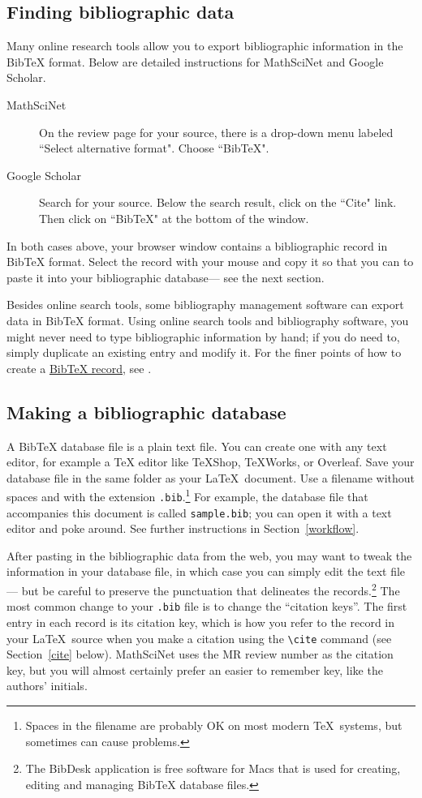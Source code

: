\documentclass[11pt]{amsart}
\theoremstyle{definition}                  %
\theoremstyle{remark}                       %
\numberwithin{equation}{section}
\begin{document}
\subsection{Finding bibliographic data}

Many online research tools allow you to export bibliographic information in the BibTeX format. Below are detailed instructions for MathSciNet and Google Scholar.

\begin{description}
\item[MathSciNet]
On the review page for your source, there is a drop-down menu labeled ``Select alternative format". Choose ``BibTeX". 
\item[Google Scholar]
Search for your source. Below the search result, click on the ``Cite" link. Then click on ``BibTeX" at the bottom of the window. 
\end{description}
In both cases above, your browser window contains a bibliographic record in BibTeX format. Select the record with your mouse and copy it so that you can to paste it into your bibliographic database--- see the next section.

Besides online search tools, some bibliography management software  can export data in BibTeX format. Using  online search tools and bibliography software, you might never need to type bibliographic information by hand;  if you do need to, simply duplicate an existing entry and modify it. For the finer points of how to create a \href{https://en.wikibooks.org/wiki/LaTeX/Bibliography_Management}{BibTeX record}, see \cite[\S 5.3.3.1--5]{wikibook}.

\subsection{Making a bibliographic database}
A BibTeX database file is a plain text file. You can create one with any text editor, for example a TeX editor like TeXShop, TeXWorks, or Overleaf.
Save your database file in the same folder as your \LaTeX\ document. Use a filename without spaces and with the extension \texttt{.bib}.\footnote{Spaces in the filename are probably OK on most modern \TeX\ systems, but sometimes can cause  problems.} For example, the database file that accompanies this document is called \texttt{sample.bib}; you can open it with a text editor and poke around. See further instructions in Section~\ref{workflow}.

After pasting in the bibliographic data from the web, you may want to tweak the information in your database file, in which case you can simply edit the text file---  but be careful to preserve the punctuation that delineates the records.\footnote{The BibDesk application is free software for Macs that is used for creating, editing and managing BibTeX database files.}
 The most common change to your \texttt{.bib} file is to change the ``citation keys''.  The first entry in each record is its citation key, which is how you refer to the record in your \LaTeX\ source when you make a citation using the \verb+\cite+ command (see Section~\ref{cite} below). MathSciNet uses the MR review number as the citation key, but you will almost certainly  prefer an easier to remember key, like the authors' initials. 
\end{document}
